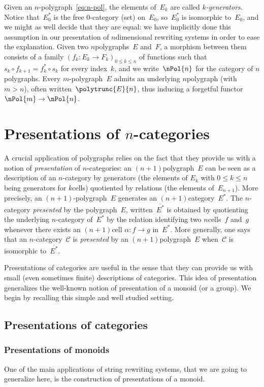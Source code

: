 \documentclass{LMCS}
\renewcommand{\leq}{\leqslant}
\renewcommand{\C}{\mathcal{C}}
\begin{document}
Given an $n$-polygraph~\eqref{eq:n-pol}, the elements of~$E_k$ are called
\emph{$k$-generators}. Notice that~$E_0^*$ is the free 0-category (\ie set)
on~$E_0$, so~$E_0^*$ is isomorphic to~$E_0$, and we might as well decide that
they are equal: we have implicitly done this assumption in our presentation of
$n$\nbd{}dimensional rewriting systems in order to ease the explanation. Given
two $n$\nbd{}polygraphs~$E$ and~$F$, a morphism between them consists of a
family \hbox{$(f_k:E_k\to F_k)_{0\leq k\leq n}$} of functions such that
$s_k\circ f_{k+1}=f_k^*\circ s_k$ for every index~$k$, and we write~$\nPol{n}$
for the category of $n$\nbd{}polygraphs. Every $m$-polygraph~$E$ admits an
underlying $n$\nbd{}polygraph (with~$m>n$), often written~$\polytrunc{E}{n}$,
thus inducing a forgetful functor~$\nPol{m}\to\nPol{n}$.

\section{Presentations of $n$-categories}
\label{sec:pres-n-cat}
A crucial application of polygraphs relies on the fact that they provide us with
a notion of \emph{presentation} of $n$-categories: an $(n+1)$\nbd{}polygraph~$E$
can be seen as a description of an $n$-category by generators (the elements of
$E_k$ with $0\leq k\leq n$ being generators for $k$\nbd{}cells) quotiented by
relations (the elements of~$E_{n+1}$). More precisely, an $(n+1)$-polygraph~$E$
generates an $(n+1)$\nbd{}category~$E^*$. The $n$-category \emph{presented} by
the polygraph~$E$, written~$\overline{E^*}$ is obtained by quotienting the
underlying $n$-category of~$E^*$ by the relation identifying two
$n$\nbd{}cells~$f$ and~$g$ whenever there exists an $(n+1)$\nbd{}cell
$\alpha:f\to g$ in~$E^*$. More generally, one says that an $n$-category~$\C$ is
\emph{presented} by an $(n+1)$\nbd{}polygraph~$E$ when~$\C$ is isomorphic
to~$\overline{E^*}$.

Presentations of categories are useful in the sense that they can provide us
with small (even sometimes finite) descriptions of categories. This idea of
presentation generalizes the well-known notion of presentation of a monoid (or a
group). We begin by recalling this simple and well studied setting.

\subsection{Presentations of categories}
\subsubsection{Presentations of monoids}
\label{sec:mon-pres}
One of the main applications of string rewriting systems, that we are going to
generalize here, is the construction of presentations of a monoid.
\end{document}
